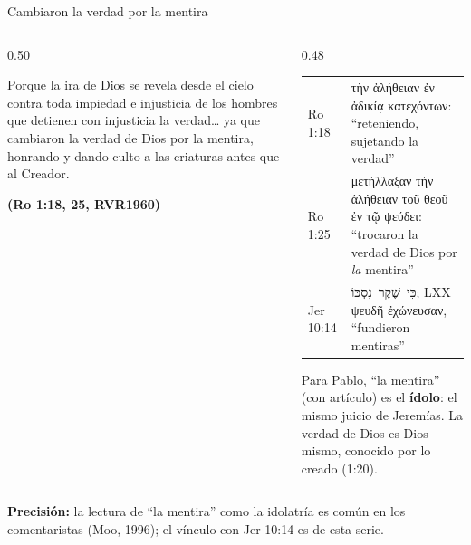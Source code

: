 \documentclass[hyperref={bookmarks=false},aspectratio=169]{beamer}
\newcommand{\heb}[1]{\mbox{\foreignlanguage{hebrew}{#1}}}
\newcommand{\grc}[1]{\foreignlanguage{ancientgreek}{#1}}
\newcommand{\fuente}[1]{\par\hfill{\upshape\bfseries\footnotesize\textcolor{azul}{#1}}}
\newcommand{\destacar}[1]{\textbf{\textcolor{azul}{#1}}}
\newcommand{\precision}[1]{{\footnotesize\color{gris}\textbf{Precisión:} #1}}
\begin{document}
\begin{frame}{Cambiaron la verdad por la mentira}
\begin{columns}[t,onlytextwidth]
\begin{column}{0.50\textwidth}
\begin{cita}Porque la ira de Dios se revela desde el cielo contra toda impiedad e injusticia de los hombres que detienen con injusticia la verdad\ldots{} ya que cambiaron la verdad de Dios por la mentira, honrando y dando culto a las criaturas antes que al Creador.\fuente{(Ro 1:18, 25, RVR1960)}\end{cita}
\end{column}
\begin{column}{0.48\textwidth}
\scriptsize\renewcommand{\arraystretch}{1.15}
\begin{tabular}{@{}>{\RaggedRight\arraybackslash}p{1.7cm}>{\RaggedRight\arraybackslash}p{3.7cm}@{}}
\toprule
Ro 1:18 & \grc{τὴν ἀλήθειαν ἐν ἀδικίᾳ κατεχόντων}: ``reteniendo, sujetando la verdad'' \\
Ro 1:25 & \grc{μετήλλαξαν τὴν ἀλήθειαν τοῦ θεοῦ ἐν τῷ ψεύδει}: ``trocaron la verdad de Dios por \emph{la} mentira'' \\
Jer 10:14 & \heb{כִּי שֶׁקֶר נִסְכּוֹ}; LXX \grc{ψευδῆ ἐχώνευσαν}, ``fundieron mentiras'' \\
\bottomrule
\end{tabular}\par\medskip
\small Para Pablo, ``la mentira'' (con artículo) es el \destacar{ídolo}: el mismo juicio de Jeremías. La verdad de Dios es Dios mismo, conocido por lo creado (1:20).
\end{column}
\end{columns}
\precision{la lectura de ``la mentira'' como la idolatría es común en los comentaristas (Moo, 1996); el vínculo con Jer 10:14 es de esta serie.}
\end{frame}
\end{document}
